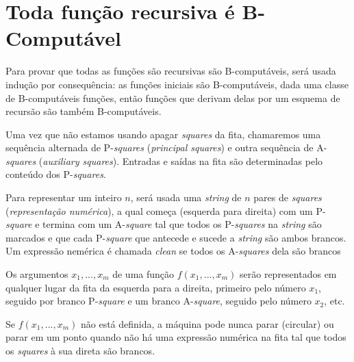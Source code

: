 \documentclass[10pt,letterpaper]{article}
\begin{document}
\section{Toda fun\c{c}\~{a}o recursiva \'e B-Comput\'avel}

Para provar que todas as fun\c{c}\~{o}es s\~{a}o recursivas s\~{a}o B-comput\'aveis, ser\'a usada indu\c{c}\~{a}o por consequ\^encia: as fun\c{c}\~{o}es iniciais s\~{a}o B-comput\'aveis, dada uma classe de B-comput\'aveis fun\c{c}\~{o}es, ent\~{a}o fun\c{c}\~{o}es que derivam delas por um esquema de recurs\~{a}o s\~{a}o tamb\'em B-comput\'aveis.

Uma vez que n\~{a}o estamos usando apagar \textit{squares} da fita, chamaremos uma sequ\^encia alternada de P-\textit{squares} (\textit{principal squares}) e outra sequ\^encia de A-\textit{squares} (\textit{auxiliary squares}). Entradas e sa\'idas na fita s\~{a}o determinadas pelo conte\'udo dos P-\textit{squares}.

Para representar um inteiro $n$, ser\'a usada uma \textit{string} de $n$ pares de \textit{squares} (\textit{representa\c{c}\~{a}o num\'erica}), a qual come\c{c}a (esquerda para direita) com um P-\textit{square} e termina com um A-\textit{square} tal que todos os P-\textit{squares} na \textit{string} s\~{a}o marcados e que cada P-\textit{square} que antecede e sucede a \textit{string} s\~{a}o ambos brancos. Um express\~{a}o nem\'erica \'e chamada \textit{clean}  se todos os A-\textit{squares} dela s\~{a}o brancos

Os argumentos $x_1, ... , x_m$ de uma fun\c{c}\~{a}o $f(x_1, ... , x_m)$ ser\~{a}o representados em qualquer lugar da fita da esquerda para a direita, primeiro pelo n\'umero $x_1$, seguido por branco P-\textit{square} e um branco A-\textit{square}, seguido pelo n\'umero $x_2$, etc.

Se $f(x_1, ... , x_m)$ n\~{a}o est\'a definida, a m\'aquina pode nunca parar (circular) ou parar em um ponto quando n\~{a}o h\'a uma express\~{a}o num\'erica na fita tal que todos os \textit{squares} \`a sua direta s\~{a}o brancos.
\end{document}
